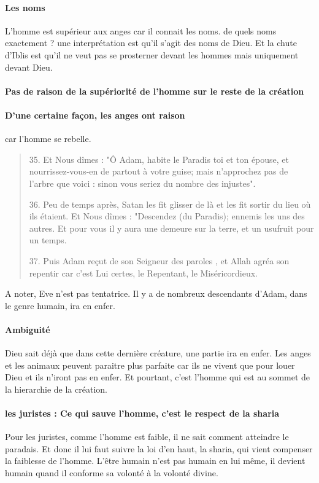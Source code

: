 \paragraph{Les noms}
L'homme est supérieur aux anges car il connait les noms. de quels noms exactement ? une interprétation est qu'il s'agit des noms de Dieu. Et la chute d'Iblis est qu'il ne veut pas se prosterner devant les hommes mais uniquement devant Dieu.

\paragraph{Pas de raison de la supériorité de l'homme sur le reste de la création}


\paragraph{D'une certaine façon, les anges ont raison} car l'homme se rebelle. 
\begin{quote}
    35. Et Nous dîmes : "Ô Adam, habite le Paradis toi et ton épouse, et nourrissez-vous-en de partout à votre guise; mais n'approchez pas de l'arbre que voici : sinon vous seriez du nombre des injustes".

36. Peu de temps après, Satan les fit glisser de là et les fit sortir du lieu où ils étaient. Et Nous dîmes : "Descendez (du Paradis); ennemis les uns des autres. Et pour vous il y aura une demeure sur la terre, et un usufruit pour un temps.

37. Puis Adam reçut de son Seigneur des paroles , et Allah agréa son repentir car c'est Lui certes, le Repentant, le Miséricordieux.
\end{quote}

A noter, Eve n'est pas tentatrice.
Il y a de nombreux descendants d'Adam, dans le genre humain, ira en enfer.

\paragraph{Ambiguité} Dieu sait déjà que dans cette dernière créature, une partie ira en enfer. Les anges et les animaux peuvent paraitre plus parfaite car ils ne vivent que pour louer Dieu et ils n'iront pas en enfer. Et pourtant, c'est l'homme qui est au sommet de la hierarchie de la création.


\paragraph{les juristes : Ce qui sauve l'homme, c'est le respect de la sharia} Pour les juristes, comme l'homme est faible, il ne sait comment atteindre le paradais. Et donc il lui faut suivre la loi d'en haut, la sharia, qui vient compenser la faiblesse de l'homme. L'être humain n'est pas humain en lui même, il devient humain quand il conforme sa volonté à la volonté divine. 


